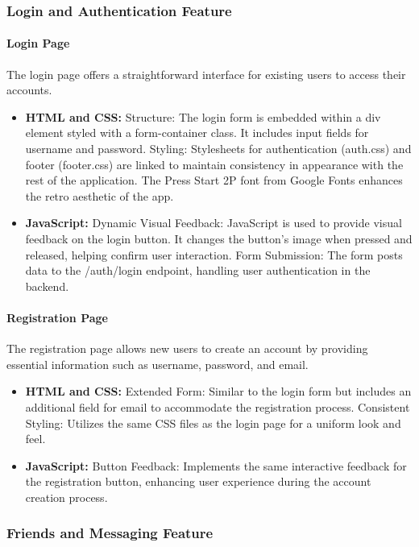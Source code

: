 \documentclass[12pt]{article}
\begin{document}
\subsubsection{Login and Authentication Feature}
\paragraph{Login Page}
The login page offers a straightforward interface for existing users to access their accounts.
\begin{itemize}
    \item \textbf{HTML and CSS:} Structure: The login form is embedded within a div element styled with a form-container class. It includes input fields for username and password. Styling: Stylesheets for authentication (auth.css) and footer (footer.css) are linked to maintain consistency in appearance with the rest of the application. The Press Start 2P font from Google Fonts enhances the retro aesthetic of the app.
    \item \textbf{JavaScript:} Dynamic Visual Feedback: JavaScript is used to provide visual feedback on the login button. It changes the button's image when pressed and released, helping confirm user interaction. Form Submission: The form posts data to the /auth/login endpoint, handling user authentication in the backend.
\end{itemize}
\paragraph{Registration Page}
The registration page allows new users to create an account by providing essential information such as username, password, and email.
\begin{itemize}
    \item \textbf{HTML and CSS:} Extended Form: Similar to the login form but includes an additional field for email to accommodate the registration process. Consistent Styling: Utilizes the same CSS files as the login page for a uniform look and feel.
    \item \textbf{JavaScript:} Button Feedback: Implements the same interactive feedback for the registration button, enhancing user experience during the account creation process.
\end{itemize}

\subsubsection{Friends and Messaging Feature}
\end{document}
